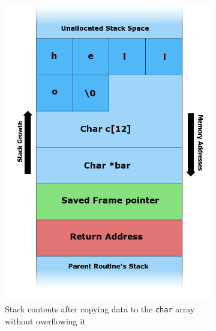 \begin{figure}[htb]
\begin{subfigure}[t]{0.28\textwidth}
		\includegraphics[height=0.25\textheight]{figures/Stack_Overflow_3}
		\caption{Stack contents after copying data to the \texttt{char} array without overflowing it \cite{Lynn2007a}}
		\label{fig:stack-layout-no-overflow}
	\end{subfigure}
	\hfill
	\begin{subfigure}[t]{0.28\textwidth}
		\centering

\end{subfigure}
\end{figure}
